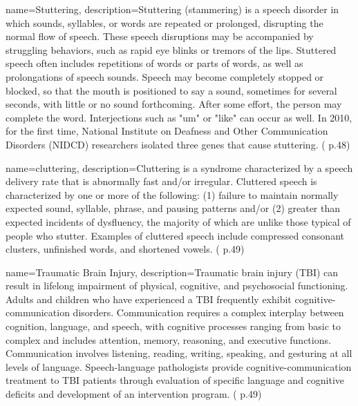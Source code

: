  {
	name={Stuttering}, 
	description={Stuttering (stammering) is a speech disorder in which sounds, syllables, or words are repeated or prolonged, disrupting the normal flow of speech. These speech disruptions may be accompanied by struggling behaviors, such as rapid eye blinks or tremors of the lips. Stuttered speech often includes repetitions of words or parts of words, as well as prolongations of speech sounds. Speech may become completely stopped or blocked, so that the mouth is positioned to say a sound, sometimes for several seconds, with little or no sound forthcoming. After some effort, the person may complete the word. Interjections such as "um" or "like" can occur as well. In 2010, for the first time, National Institute on Deafness and Other Communication Disorders (NIDCD) researchers isolated three genes that cause stuttering. (\cite{SLPathologies} p.48)
}
}

 {
	name={cluttering}, 
	description={Cluttering is a syndrome characterized by a speech delivery rate that is abnormally fast and/or irregular. Cluttered speech is characterized by one or more of the following: (1) failure to maintain normally expected sound, syllable, phrase, and pausing patterns and/or (2) greater than expected incidents of dysfluency, the majority of which are unlike those typical of people who stutter. Examples of cluttered speech include compressed consonant clusters, unfinished words, and shortened vowels. (\cite{SLPathologies} p.49)
}
}

 {
	name={Traumatic Brain Injury}, 
	description={Traumatic brain injury (TBI) can result in lifelong impairment of physical, cognitive, and psychosocial functioning. Adults and children who have experienced a TBI frequently exhibit cognitive-communication disorders. Communication requires a complex interplay between cognition, language, and speech, with cognitive processes ranging from basic to complex and includes attention, memory, reasoning, and executive functions. Communication involves listening, reading, writing, speaking, and gesturing at all levels of language. Speech-language pathologists provide cognitive-communication treatment to TBI patients through evaluation of specific language and cognitive deficits and development of an intervention program. (\cite{SLPathologies} p.49)
}%
}

